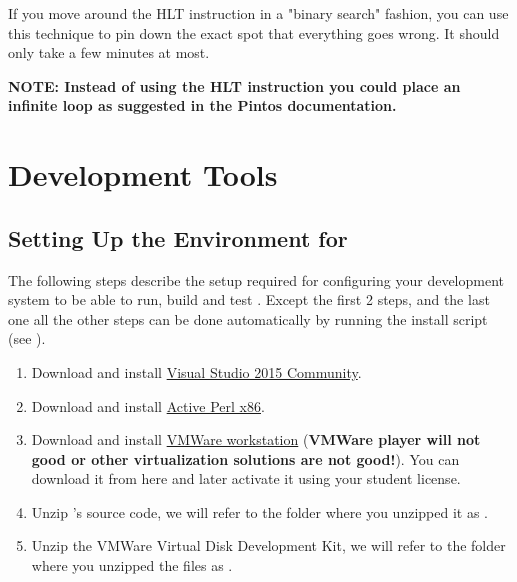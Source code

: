 \begin{appendices}
If you move around the HLT instruction in a "binary search" fashion, you can use this technique to
pin down the exact spot that everything goes wrong. It should only take a few minutes at most.

\textbf{NOTE: Instead of using the HLT instruction you could place an infinite loop as suggested in
the Pintos documentation.}

\chapter{Development Tools}

\section{Setting Up the Environment for \projectname}
\label{sect:SetupBuild}

The following steps describe the setup required for configuring your development system to be
able to run, build and test \projectname. Except the first 2 steps, and the last one all the other
steps can be done automatically by running the install script 
(see ).
\begin{enumerate}
	\item Download and install 
\href{https://www.visualstudio.com/post-download-vs/?sku=community&clcid=0x409&downloadrename=true}{Visual Studio 2015 Community}.

	\item Download and install
\href{http://www.activestate.com/activeperl/downloads/thank-you?dl=http://downloads.activestate.com/ActivePerl/releases/5.24.0.2400/ActivePerl-5.24.0.2400-MSWin32-x86-64int-300560.exe}{Active Perl x86}.

	\item Download and install \href{http://www.vmware.com/go/tryworkstation}{VMWare workstation}
(\textbf{VMWare player will not good or other virtualization solutions are not good!}). You can
download it from here and later activate it using your student license.

	\item Unzip \projectname's source code, we will refer to the folder where you unzipped it as
.

	\item Unzip the VMWare Virtual Disk Development Kit, we will refer to the folder where you
unzipped the files as .


\end{enumerate}
\end{appendices}
